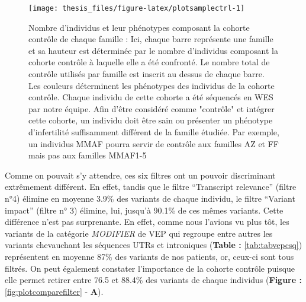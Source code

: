 \documentclass[12pt,twoside]{reedthesis}
\theoremstyle{definition}
\theoremstyle{definition}
\theoremstyle{remark}
\begin{document}
  \begin{figure}
  
  {\centering \texttt{[image: thesis\_files/figure-latex/plotsamplectrl-1]} 
  
  }
  
  \caption[Nombre d'individus et leur phénotypes composant la cohorte contrôle de chaque famille]{Nombre d'individus et leur phénotypes composant la cohorte contrôle de chaque famille : Ici, chaque barre représente une famille et sa hauteur est déterminée par le nombre d'individus composant la cohorte contrôle à laquelle elle a été confronté. Le nombre total de contrôle utilisés par famille est inscrit au dessus de chaque barre. Les couleurs déterminent les phénotypes des individus de la cohorte contrôle. Chaque individu de cette cohorte a été séquencés en WES par notre équipe. Afin d'être considéré comme "contrôle" et intégrer cette cohorte, un individu doit être sain ou présenter un phénotype d'infertilité suffisamment différent de la famille étudiée. Par exemple, un individus MMAF pourra servir de contrôle aux familles AZ et FF mais pas aux familles MMAF1-5}\label{fig:plotsamplectrl}
  \end{figure}
  
  \newpage
  
  Comme on pouvait s'y attendre, ces six filtres ont un pouvoir
  discriminant extrêmement différent. En effet, tandis que le filtre
  ``Transcript relevance'' (filtre n°4) élimine en moyenne 3.9\% des
  variants de chaque individu, le filtre ``Variant impact'' (filtre n° 3)
  élimine, lui, jusqu'à 90.1\% de ces mêmes variants. Cette différence
  n'est pas surprenante. En effet, comme nous l'avions vu plus tôt, les
  variants de la catégorie \emph{MODIFIER} de VEP qui regroupe entre
  autres les variants chevauchant les séquences UTRs et introniques
  (\textbf{Table :} \ref{tab:tabvepcsq}) représentent en moyenne 87\% des
  variants de nos patients, or, ceux-ci sont tous filtrés. On peut
  également constater l'importance de la cohorte contrôle puisque elle
  permet retirer entre 76.5 et 88.4\% des variants de chaque individus
  (\textbf{Figure :} \ref{fig:plotcomparefilter} - \textbf{A}).
  
\end{document}
